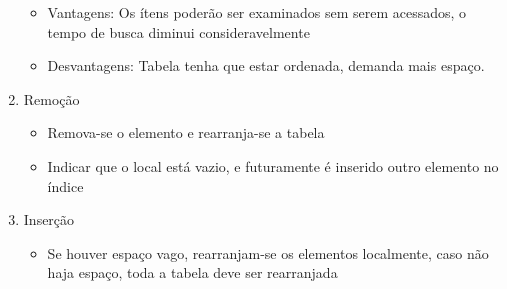 \documentclass{article}
\begin{document}
\begin{enumerate}
		\begin{itemize}
		\item Vantagens: Os ítens poderão ser examinados sem serem acessados, o tempo de busca diminui consideravelmente
		\item Desvantagens: Tabela tenha que estar ordenada, demanda mais espaço.
		\end{itemize}
	\item Remoção
		\begin{itemize}
		\item Remova-se o elemento e rearranja-se a tabela
		\item Indicar que o local está vazio, e futuramente é inserido outro elemento no índice
		\end{itemize}
	\item Inserção
		\begin{itemize}
		\item Se houver espaço vago, rearranjam-se os elementos localmente, caso não haja espaço, toda a tabela deve ser rearranjada
		\end{itemize}
	\end{enumerate}
\end{document}
